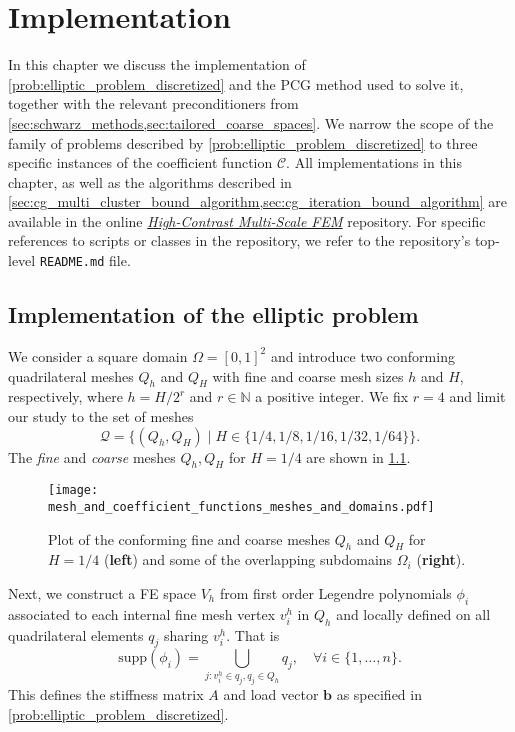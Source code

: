 \chapter{Implementation}\label{ch:implementation}
In this chapter we discuss the implementation of \cref{prob:elliptic_problem_discretized} and the PCG method used to solve it, together with the relevant preconditioners from \cref{sec:schwarz_methods,sec:tailored_coarse_spaces}. We narrow the scope of the family of problems described by \cref{prob:elliptic_problem_discretized} to three specific instances of the coefficient function $\mathcal{C}$. All implementations in this chapter, as well as the algorithms described in \cref{sec:cg_multi_cluster_bound_algorithm,sec:cg_iteration_bound_algorithm} are available in the online \href{https://github.com/PhilipSoliman/hcmsfem}{\textit{High-Contrast Multi-Scale FEM}} repository. For specific references to scripts or classes in the repository, we refer to the repository's top-level \texttt{README.md} file.

\section{Implementation of the elliptic problem}\label{sec:implementation_elliptic_problem}
We consider a square domain $\Omega = [0,1]^2$ and introduce two conforming quadrilateral meshes $Q_h$ and $Q_H$ with fine and coarse mesh sizes $h$ and $H$, respectively, where $h = H/2^r$ and $r\in\mathbb{N}$ a positive integer. We fix $r=4$ and limit our study to the set of meshes
\begin{equation}
    \mathcal{Q} = \{(Q_h, Q_H)\mid H\in\{1/4, 1/8, 1/16, 1/32, 1/64\}\}.
    \label{eq:meshes}
\end{equation}
The \textit{fine} and \textit{coarse} meshes $Q_h, Q_H$ for $H=1/4$ are shown in \cref{fig:mesh_4}.
\begin{figure}[H]
    \centering
    \texttt{[image: mesh\_and\_coefficient\_functions\_meshes\_and\_domains.pdf]}
    \caption{Plot of the conforming fine and coarse meshes $Q_h$ and $Q_H$ for $H=1/4$ (\textbf{left}) and some of the overlapping subdomains $\Omega_i$ (\textbf{right}).}
    \label{fig:mesh_4}
\end{figure}
Next, we construct a FE space $V_h$ from first order Legendre polynomials $\phi_i$ associated to each internal fine mesh vertex $v^h_i$ in $Q_h$ and locally defined on all quadrilateral elements $q_j$ sharing $v^h_i$. That is
\[
    \text{supp}(\phi_i) = \bigcup_{j: v^h_i\in q_j, q_j \in Q_h} q_j, \quad \forall i\in\{1,\ldots,n\}.
\]
This defines the stiffness matrix $A$ and load vector $\mathbf{b}$ as specified in \cref{prob:elliptic_problem_discretized}.

